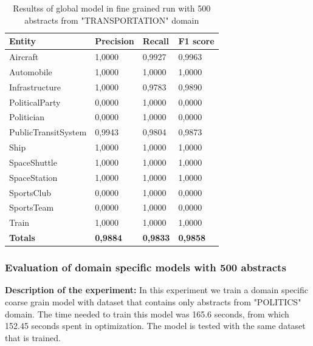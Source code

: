 \documentclass[thesis=M,english]{FITthesis}[2018/05/30]
\begin{document}
	\begin{table}[H]\centering
		\begin{tabular}{|l|l|l|l|}
			\hline {\textbf{Entity}} & {\textbf{Precision}} & {\textbf{Recall}} & {\textbf{F1 score}}\\\hline
				Aircraft & 1,0000 & 0,9927 & 0,9963\\
				Automobile & 1,0000 & 1,0000 & 1,0000\\				
				Infrastructure & 1,0000 & 0,9783 & 0,9890\\
				PoliticalParty & 0,0000 & 1,0000 & 0,0000\\				
				Politician & 0,0000 & 1,0000 & 0,0000\\				
				PublicTransitSystem & 0,9943 & 0,9804 & 0,9873\\
				Ship & 1,0000 & 1,0000 & 1,0000\\				
				SpaceShuttle & 1,0000 & 1,0000 & 1,0000\\
				SpaceStation & 1,0000 & 1,0000 & 1,0000\\
				SportsClub & 0,0000 & 1,0000 & 0,0000\\
				SportsTeam & 0,0000 & 1,0000 & 0,0000\\
				Train & 1,0000 & 1,0000 & 1,0000\\\hline
				\textbf{Totals} & \textbf{0,9884} & \textbf{0,9833} & \textbf{0,9858}\\\hline
		\end{tabular}
		\caption{Resultss of global model in fine grained run with 500 abstracts from "TRANSPORTATION" domain \label{table:500GlobalDomainWithTransportationTop500Fine}}
	\end{table}		
	

\subsubsection{Evaluation of domain specific models with 500 abstracts}

	\textbf{Description of the experiment:} In this experiment we train a domain specific coarse grain model with dataset that contains only abstracts from "POLITICS" domain. The time needed to train this model was 165.6 seconds, from which 152.45 seconds spent in optimization. The model is tested with the same dataset that is trained.
\end{document}
